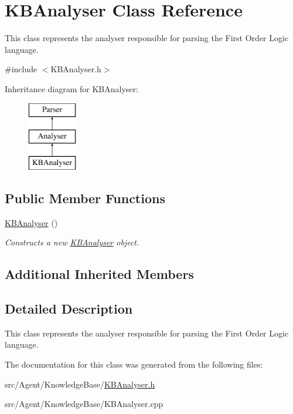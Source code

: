 \hypertarget{classKBAnalyser}{}\section{K\+B\+Analyser Class Reference}
\label{classKBAnalyser}


This class represents the analyser responsible for parsing the First Order Logic language.  




{\ttfamily \#include $<$K\+B\+Analyser.\+h$>$}

Inheritance diagram for K\+B\+Analyser\+:\begin{figure}[H]
\begin{center}
\leavevmode
\includegraphics[height=3.000000cm]{classKBAnalyser}
\end{center}
\end{figure}
\subsection*{Public Member Functions}
\begin{DoxyCompactItemize}
\item 
\mbox{\label{classKBAnalyser_affef4d1e6d712d466457a2155df4febe}} 
\mbox{\hyperlink{classKBAnalyser_affef4d1e6d712d466457a2155df4febe}{K\+B\+Analyser}} ()
\begin{DoxyCompactList}\small\item\em Constructs a new \mbox{\hyperlink{classKBAnalyser}{K\+B\+Analyser}} object. \end{DoxyCompactList}\end{DoxyCompactItemize}
\subsection*{Additional Inherited Members}


\subsection{Detailed Description}
This class represents the analyser responsible for parsing the First Order Logic language. 

The documentation for this class was generated from the following files\+:\begin{DoxyCompactItemize}
\item 
src/\+Agent/\+Knowledge\+Base/\mbox{\hyperlink{KBAnalyser_8h}{K\+B\+Analyser.\+h}}\item 
src/\+Agent/\+Knowledge\+Base/K\+B\+Analyser.\+cpp\end{DoxyCompactItemize}
